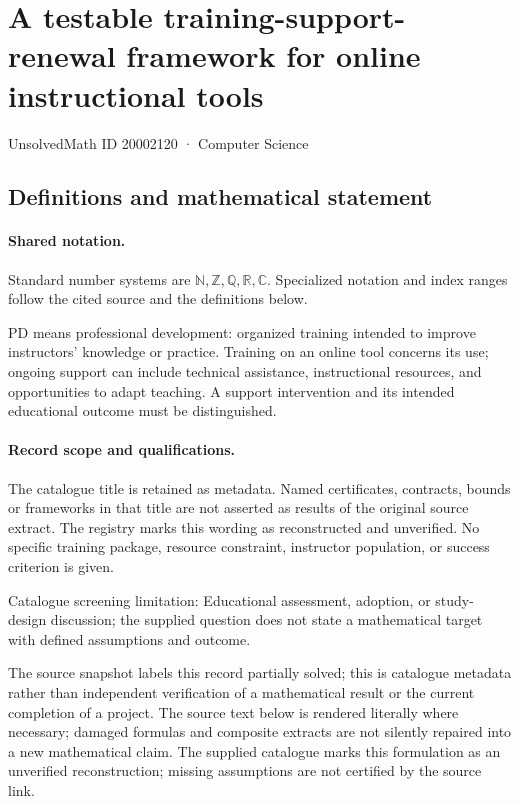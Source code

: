 \documentclass[11pt]{article}
\begin{document}
\setcounter{section}{20002119}
\section{A testable training-support-renewal framework for online instructional tools}\label{20002120}
{\small\sffamily UnsolvedMath ID 20002120 · Computer Science}
\subsection{Definitions and mathematical statement}

\paragraph{Shared notation.}Standard number systems are $\mathbb N,\mathbb Z,\mathbb Q,\mathbb R,\mathbb C$. Specialized notation and index ranges follow the cited source and the definitions below.


PD means professional development: organized training intended to improve instructors' knowledge or practice. Training on an online tool concerns its use; ongoing support can include technical assistance, instructional resources, and opportunities to adapt teaching. A support intervention and its intended educational outcome must be distinguished.
\paragraph{Record scope and qualifications.}
The catalogue title is retained as metadata. Named certificates, contracts, bounds or frameworks in that title are not asserted as results of the original source extract.
The registry marks this wording as reconstructed and unverified. No specific training package, resource constraint, instructor population, or success criterion is given.

Catalogue screening limitation: Educational assessment, adoption, or study-design discussion; the supplied question does not state a mathematical target with defined assumptions and outcome.

The source snapshot labels this record partially solved; this is catalogue metadata rather than independent verification of a mathematical result or the current completion of a project.
The source text below is rendered literally where necessary; damaged formulas and composite extracts are not silently repaired into a new mathematical claim.
The supplied catalogue marks this formulation as an unverified reconstruction; missing assumptions are not certified by the source link.
\end{document}
